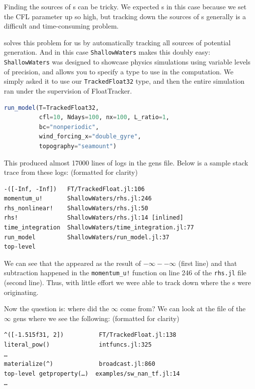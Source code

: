 \documentclass{juliacon}
\begin{document}
Finding the sources of \NaN{}s can be tricky.
We expected \NaN{}s in this case because we set the CFL parameter up so high, but tracking down the sources of \NaN{}s generally is a difficult and time-consuming problem.

\FT{} solves this problem for us by automatically tracking all sources of potential \NaN{} generation.
And in this case \texttt{ShallowWaters} makes this doubly easy:
\texttt{ShallowWaters} was designed to showcase physics simulations using variable levels of \fp{} precision, and allows you to specify a \fp{} type to use in the computation.
We simply asked it to use our \texttt{TrackedFloat32} type, and then the entire simulation ran under the supervision of FloatTracker.

\begin{lstlisting}[language = Julia]
run_model(T=TrackedFloat32,
          cfl=10, Ndays=100, nx=100, L_ratio=1,
          bc="nonperiodic",
          wind_forcing_x="double_gyre",
          topography="seamount")
\end{lstlisting}

This produced almost 17000 lines of logs in the gens file. Below is a sample stack trace from these logs: (formatted for clarity)

\begin{verbatim}
-([-Inf, -Inf])   FT/TrackedFloat.jl:106
momentum_u!       ShallowWaters/rhs.jl:246
rhs_nonlinear!    ShallowWaters/rhs.jl:50
rhs!              ShallowWaters/rhs.jl:14 [inlined]
time_integration  ShallowWaters/time_integration.jl:77
run_model         ShallowWaters/run_model.jl:37
top-level
\end{verbatim}

We can see that the \NaN{} appeared as the result of $-\infty - -\infty$ (first line) and that subtraction happened in the \texttt{momentum\_u!} function on line 246 of the \texttt{rhs.jl} file (second line).
Thus, with little effort we were able to track down where the \NaN{}s were originating.

Now the question is: where did the $\infty$ come from?
We can look at the file of the $\infty$ gens where we see the following: (formatted for clarity)

\begin{verbatim}
^([-1.515f31, 2])          FT/TrackedFloat.jl:138
literal_pow()              intfuncs.jl:325
…
materialize(^)             broadcast.jl:860
top-level getproperty(…)  examples/sw_nan_tf.jl:14
…
\end{verbatim}
\end{document}
